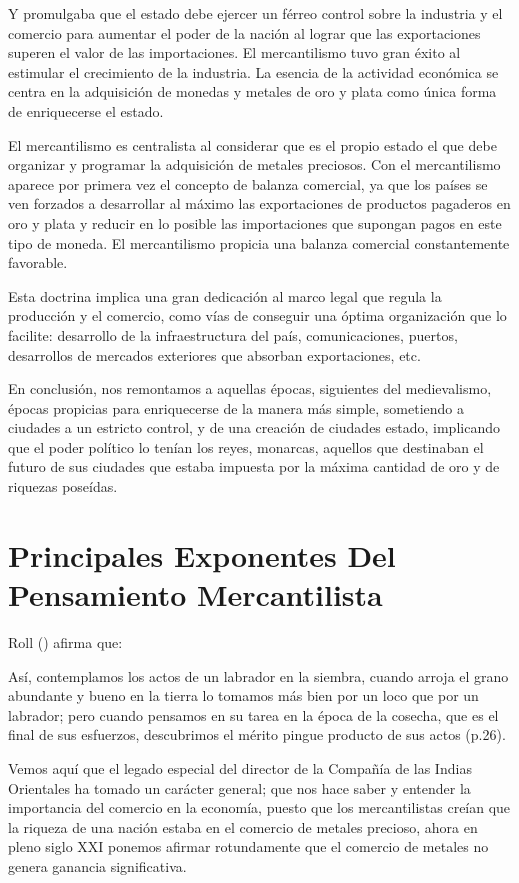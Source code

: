 \documentclass[
  jou,
  floatsintext,
  longtable,
  a4paper,
  nolmodern,
  notxfonts,
  notimes,
  colorlinks=true,linkcolor=blue,citecolor=blue,urlcolor=blue]{apa7}
\begin{document}
Y promulgaba que el estado debe ejercer un férreo control sobre la
industria y el comercio para aumentar el poder de la nación al lograr
que las exportaciones superen el valor de las importaciones. El
mercantilismo tuvo gran éxito al estimular el crecimiento de la
industria. La esencia de la actividad económica se centra en la
adquisición de monedas y metales de oro y plata como única forma de
enriquecerse el estado.

El mercantilismo es centralista al considerar que es el propio estado el
que debe organizar y programar la adquisición de metales preciosos. Con
el mercantilismo aparece por primera vez el concepto de balanza
comercial, ya que los países se ven forzados a desarrollar al máximo las
exportaciones de productos pagaderos en oro y plata y reducir en lo
posible las importaciones que supongan pagos en este tipo de moneda. El
mercantilismo propicia una balanza comercial constantemente favorable.

Esta doctrina implica una gran dedicación al marco legal que regula la
producción y el comercio, como vías de conseguir una óptima organización
que lo facilite: desarrollo de la infraestructura del país,
comunicaciones, puertos, desarrollos de mercados exteriores que absorban
exportaciones, etc.

En conclusión, nos remontamos a aquellas épocas, siguientes del
medievalismo, épocas propicias para enriquecerse de la manera más
simple, sometiendo a ciudades a un estricto control, y de una creación
de ciudades estado, implicando que el poder político lo tenían los
reyes, monarcas, aquellos que destinaban el futuro de sus ciudades que
estaba impuesta por la máxima cantidad de oro y de riquezas poseídas.

\section{Principales Exponentes Del Pensamiento
Mercantilista}\label{principales-exponentes-del-pensamiento-mercantilista}

Roll () afirma
que:

Así, contemplamos los actos de un labrador en la siembra, cuando arroja
el grano abundante y bueno en la tierra lo tomamos más bien por un loco
que por un labrador; pero cuando pensamos en su tarea en la época de la
cosecha, que es el final de sus esfuerzos, descubrimos el mérito pingue
producto de sus actos (p.26).

Vemos aquí que el legado especial del director de la Compañía de las
Indias Orientales ha tomado un carácter general; que nos hace saber y
entender la importancia del comercio en la economía, puesto que los
mercantilistas creían que la riqueza de una nación estaba en el comercio
de metales precioso, ahora en pleno siglo XXI ponemos afirmar
rotundamente que el comercio de metales no genera ganancia
significativa.
\end{document}
